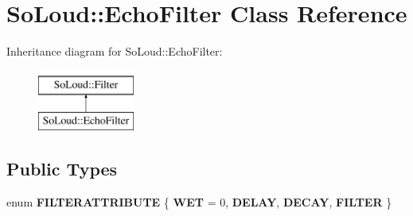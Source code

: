 \hypertarget{class_so_loud_1_1_echo_filter}{}\section{So\+Loud\+::Echo\+Filter Class Reference}
\label{class_so_loud_1_1_echo_filter}
Inheritance diagram for So\+Loud\+::Echo\+Filter\+:\begin{figure}[H]
\begin{center}
\leavevmode
\includegraphics[height=2.000000cm]{class_so_loud_1_1_echo_filter}
\end{center}
\end{figure}
\subsection*{Public Types}
\begin{DoxyCompactItemize}
\item 
\mbox{\label{class_so_loud_1_1_echo_filter_a2d235a30293535490407a79e2c02f519}} 
enum {\bfseries F\+I\+L\+T\+E\+R\+A\+T\+T\+R\+I\+B\+U\+TE} \{ {\bfseries W\+ET} = 0, 
{\bfseries D\+E\+L\+AY}, 
{\bfseries D\+E\+C\+AY}, 
{\bfseries F\+I\+L\+T\+ER}
 \}
\end{DoxyCompactItemize}

